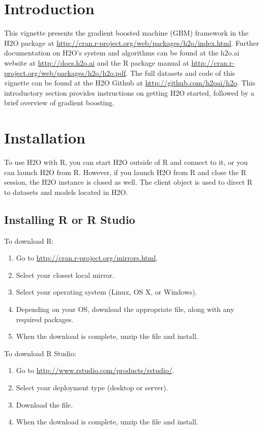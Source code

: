 \newpage


\section{Introduction}

This vignette presents the gradient boosted machine (GBM) framework in the H2O package at {\url{http://cran.r-project.org/web/packages/h2o/index.html}}. Further documentation on H2O's system and algorithms can be found at the h2o.ai website at {\url{http://docs.h2o.ai}} and the R package manual at {\url{http://cran.r-project.org/web/packages/h2o/h2o.pdf}}. The full datasets and code of this vignette can be found at the H2O Github at {\url{http://github.com/h2oai/h2o}}. This introductory section provides instructions on getting H2O started, followed by a brief overview of gradient boosting.


\section{Installation}

To use H2O with R, you can start H2O outside of R and connect to it, or you can launch H2O from R. However, if you launch H2O from R and close the R session, the H2O instance is closed as well. The client object is used to direct R to datasets and models located in H2O.

\subsection{Installing R or R Studio}

To download R:
\begin{enumerate}
\item Go to {\url{http://cran.r-project.org/mirrors.html}}. 
\item Select your closest local mirror. 
\item Select your operating system (Linux, OS X, or Windows). 
\item Depending on your OS, download the appropriate file, along with any required packages. 
\item When the download is complete, unzip the file and install. \\
\end{enumerate}

To download R Studio: 

\begin{enumerate}
\item Go to {\url{http://www.rstudio.com/products/rstudio/}}. 
\item Select your deployment type (desktop or server). 
\item Download the file. 
\item When the download is complete, unzip the file and install.
\end{enumerate}


